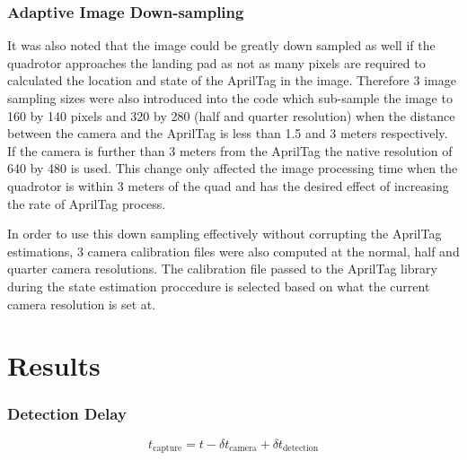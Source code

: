 \documentclass[11pt, twocolumn]{article}
\begin{document}
\subsubsection{Adaptive Image Down-sampling}
It was also noted that the image could be greatly down sampled as well if the quadrotor approaches the landing pad as not as many pixels are required to calculated the location and state of the AprilTag in the image. Therefore 3 image sampling sizes were also introduced into the code which sub-sample the image to 160 by 140 pixels and 320 by 280 (half and quarter resolution) when the distance between the camera and the AprilTag is less than 1.5 and 3 meters respectively. If the camera is further than 3 meters from the AprilTag the native resolution of 640 by 480 is used. This change only affected the image processing time when the quadrotor is within 3 meters of the quad and has the desired effect of increasing the rate of AprilTag process.

In order to use this down sampling effectively without corrupting the AprilTag estimations, 3 camera calibration files were also computed at the normal, half and quarter camera resolutions. The calibration file passed to the AprilTag library during the state estimation proccedure is selected based on what the current camera resolution is set at. 



\section{Results}


\subsubsection{Detection Delay}
\begin{equation}
    t_{\text{capture}} = t - \delta t_{\text{camera}} + \delta t_{\text{detection}}
\end{equation}


{}

\end{document}
